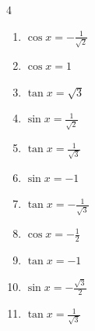 \begin{multicols}{4}
\begin{enumerate}
  \item $\displaystyle \cos{x}  = -\frac{1}{\sqrt{2}}$


  \item $\displaystyle \cos{x}  = 1$

        \phantom{$\displaystyle x = 0$}

  \item $\displaystyle \tan{x}  = \sqrt{3}$


  \item $\displaystyle \sin{x}  = \frac{1}{\sqrt{2}}$


  \item $\displaystyle \tan{x}  = \frac{1}{\sqrt{3}}$


  \item $\displaystyle \sin{x}  = -1$


  \item $\displaystyle \tan{x}  = -\frac{1}{\sqrt{3}}$


  \item $\displaystyle \cos{x}  = -\frac{1}{2}$


\columnbreak %

  \item $\displaystyle \tan{x}  = -1$


  \item $\displaystyle \sin{x}  = -\frac{\sqrt{3}}{2}$


  \item $\displaystyle \tan{x}  = \frac{1}{\sqrt{3}}$



\end{enumerate}
\end{multicols}
